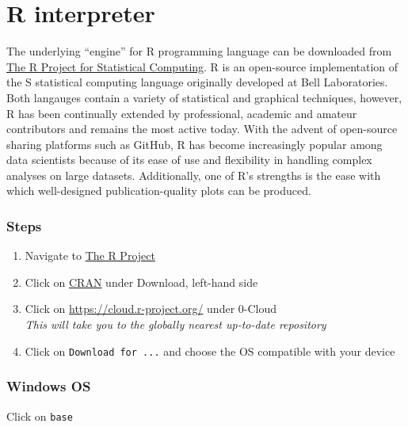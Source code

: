 \documentclass[
]{book}
\providecommand{\tightlist}{%
  \setlength{\itemsep}{0pt}\setlength{\parskip}{0pt}}
\begin{document}
\hypertarget{r-interpreter}{%
\section{R interpreter}\label{r-interpreter}}

The underlying ``engine'' for R programming language can be downloaded from \href{https://www.r-project.org/}{The R Project for Statistical Computing}. R is an open-source implementation of the S statistical computing language originally developed at Bell Laboratories. Both langauges contain a variety of statistical and graphical techniques, however, R has been continually extended by professional, academic and amateur contributors and remains the most active today. With the advent of open-source sharing platforms such as GitHub, R has become increasingly popular among data scientists because of its ease of use and flexibility in handling complex analyses on large datasets. Additionally, one of R's strengths is the ease with which well-designed publication-quality plots can be produced.

\hypertarget{steps}{%
\subsubsection*{Steps}\label{steps}}

\begin{enumerate}
\def\labelenumi{\arabic{enumi}.}
\tightlist
\item
  Navigate to \href{https://www.r-project.org/}{The R Project}
\item
  Click on \href{https://cran.r-project.org/mirrors.html}{CRAN} under Download, left-hand side
\item
  Click on \url{https://cloud.r-project.org/} under 0-Cloud\\
  \emph{This will take you to the globally nearest up-to-date repository}
\item
  Click on \texttt{Download\ for\ ...} and choose the OS compatible with your device
\end{enumerate}

\hypertarget{windows-os}{%
\subsubsection*{Windows OS}\label{windows-os}}

Click on \texttt{base}
\end{document}
